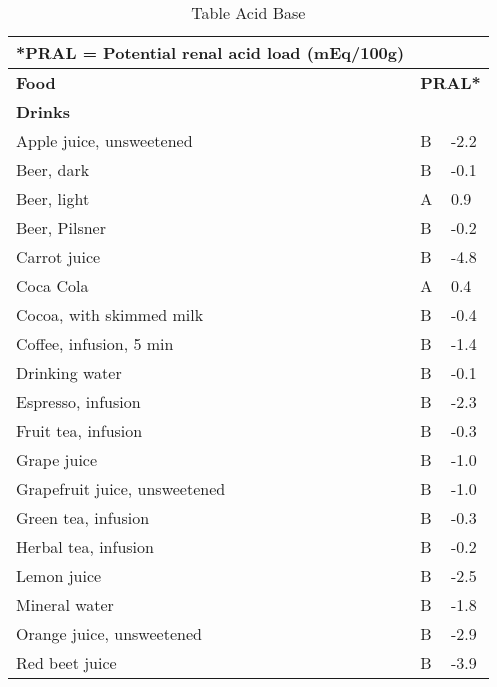 \documentclass[../main.tex]{subfiles}
\begin{document}





\clearpage
\thispagestyle{empty}
  \centering \label{tab:Acid}
\begin{longtable}{p{7cm}p{0.5cm}p{1cm}}
  \caption{Table Acid Base}\label{table:acidbase} \\
\footnotesize{*PRAL = Potential renal acid load (mEq/100g)}  \\
\toprule
    \textbf{Food}  &  \multicolumn{2}{l}{\textbf{PRAL*}}  \\
    \midrule
    \endhead
\multicolumn{3}{l}{\textbf{Drinks}}  \\
Apple juice, unsweetened   & B   & -2.2 \\
Beer, dark   & B   & -0.1 \\
Beer, light   & A   & 0.9 \\
Beer, Pilsner   & B   & -0.2 \\
Carrot juice  & B   & -4.8 \\
Coca Cola   & A   & 0.4 \\
Cocoa, with skimmed milk  & B   & -0.4 \\
Coffee, infusion, 5 min   & B   & -1.4 \\
Drinking water  & B   & -0.1 \\
Espresso, infusion   & B   & -2.3 \\
Fruit tea, infusion   & B  & -0.3 \\
Grape juice  & B   & -1.0 \\
Grapefruit juice, unsweetened   & B   & -1.0 \\
Green tea, infusion   & B   & -0.3 \\
Herbal tea, infusion   & B   & -0.2 \\
Lemon juice  & B   & -2.5 \\
Mineral water  & B   & -1.8 \\
Orange juice, unsweetened  & B   & -2.9 \\
Red beet juice  & B   & -3.9 \\

\end{longtable}
\end{document}
